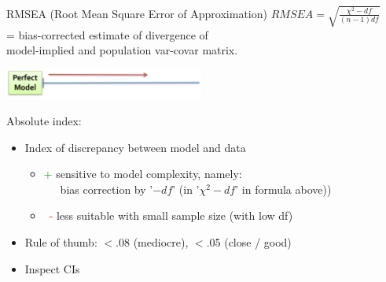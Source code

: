 \documentclass[10pt]{beamer}\usepackage[]{graphicx}\usepackage[]{xcolor}
\begin{document}
%
\begin{frame}{RMSEA (Root Mean Square Error of Approximation)}
$RMSEA = \sqrt{\frac{\chi^2 - df}{(n-1)df}}$\\
= bias-corrected estimate of divergence of \\ model-implied and population var-covar matrix.

\vspace*{3mm}
\includegraphics[height=1cm,keepaspectratio=T] {perfect_fit.png}
\hfill
\vspace*{3mm}

Absolute index:
\begin{itemize}
  \item {Index of discrepancy between model and data}
    \begin{itemize}
    \item {\textcolor{green}{+} sensitive to model complexity, namely:\\
    \ \ \ bias correction by '$-df$' (in '$\chi^2 - df$' in formula above))}
    \item {\ \textcolor{red}{-} less suitable with small sample size (with low df)}
    \end{itemize}
  \item{Rule of thumb: $<$.08 (mediocre), $<$.05 (close / good)}
  \item{Inspect CIs}
\end{itemize}
\end{frame}
%
\end{document}
